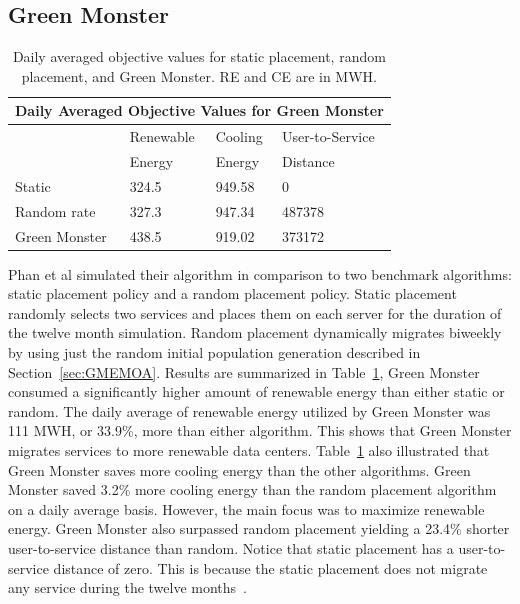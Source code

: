 \documentclass{sig-alternate}
\begin{document}
\subsection{Green Monster}
\label{sec:GM}
\begin{table}[tb]
\begin{center}
\begin{tabular}{|l|l|l|l|}
    \hline
    \multicolumn{4}{|c|}{\textbf{Daily Averaged Objective Values for Green Monster}} \\
    \hline
    & Renewable &  Cooling & User-to-Service \\
    & Energy & Energy & Distance \\
    \hline
    Static & 324.5 & 949.58 & 0 \\
    Random rate & 327.3 & 947.34 & 487378\\
   	Green Monster & 438.5 & 919.02 & 373172\\
    \hline
\end{tabular}
\caption{Daily averaged objective values for static placement, random placement, and Green Monster. RE and CE are in MWH. }
\label{tab:GMV}
\end{center}
\end{table}

Phan et al simulated their algorithm in comparison to two benchmark algorithms: static placement policy and a random placement policy. Static placement randomly selects two services and places them on each server for the duration of the twelve month simulation. Random placement dynamically migrates biweekly by using just the random initial population generation described in Section~\ref{sec:GMEMOA}. Results are summarized in Table~\ref{tab:GMV}, Green Monster consumed a significantly higher amount of renewable energy than either static or random. The daily average of renewable energy utilized by Green Monster was 111 MWH, or 33.9\%, more than either algorithm. This shows that Green Monster migrates services to more renewable data centers.  Table~\ref{tab:GMV} also illustrated that Green Monster saves more cooling energy than the other algorithms. Green Monster saved 3.2\% more cooling energy than the random placement algorithm on a daily average basis. However, the main focus was to maximize renewable energy. Green Monster also surpassed random placement yielding a 23.4\% shorter user-to-service distance than random.  Notice that static placement has a user-to-service distance of zero. This is because the static placement does not migrate any service during the twelve months~\cite{Phan}.   
\end{document}
